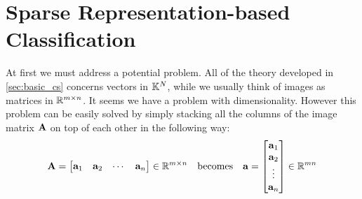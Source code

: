 \section{Sparse Representation-based Classification} \label{sec:src}
At first we must address a potential problem. All of the theory developed in \cref{sec:basic_cs} concerns vectors in $ \mathbb{K}^{N} $, while we usually think of images as matrices in $ \mathbb{R}^{m\times n} $. It seems we have a problem with dimensionality. However this problem can be easily solved by simply stacking all the columns of the image matrix $ \mathbf{A} $ on top of each other in the following way:
\[
	\mathbf{A} = \begin{bmatrix}
		\mathbf{a}_{1} & \mathbf{a}_{2} & \cdots & \mathbf{a}_{n}
	\end{bmatrix} \in \mathbb{R}^{m\times n}
	\quad\text{becomes}\quad 
	\mathbf{a} = \begin{bmatrix}
		\mathbf{a}_{1} \\
		\mathbf{a}_{2} \\
		\vdots \\
		\mathbf{a}_{n}
	\end{bmatrix} \in \mathbb{R}^{mn}
\]

